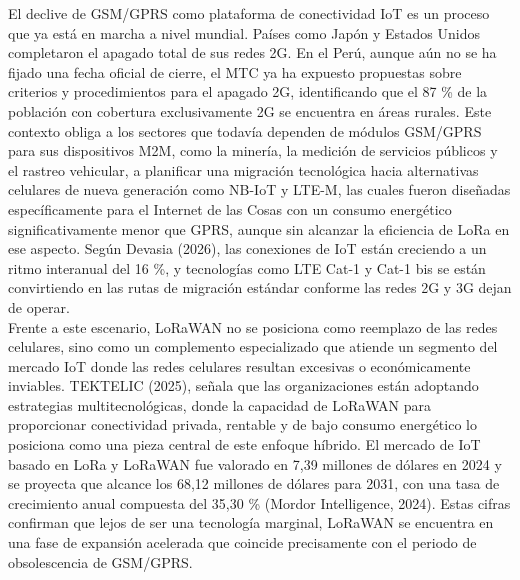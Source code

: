 \documentclass[12pt,a4paper]{article}
\begin{document}
	El declive de GSM/GPRS como plataforma de conectividad IoT es un proceso que ya está en marcha a nivel mundial. Países como Japón y Estados Unidos completaron el apagado total de sus redes 2G. En el Perú, aunque aún no se ha fijado una fecha oficial de cierre, el MTC ya ha expuesto propuestas sobre criterios y procedimientos para el apagado 2G, identificando que el 87 \% de la población con cobertura exclusivamente 2G se encuentra en áreas rurales. Este contexto obliga a los sectores que todavía dependen de módulos GSM/GPRS para sus dispositivos M2M, como la minería, la medición de servicios públicos y el rastreo vehicular, a planificar una migración tecnológica hacia alternativas celulares de nueva generación como NB-IoT y LTE-M, las cuales fueron diseñadas específicamente para el Internet de las Cosas con un consumo energético significativamente menor que GPRS, aunque sin alcanzar la eficiencia de LoRa en ese aspecto. Según Devasia (2026), las conexiones de IoT están creciendo a un ritmo interanual del 16 \%, y tecnologías como LTE Cat-1 y Cat-1 bis se están convirtiendo en las rutas de migración estándar conforme las redes 2G y 3G dejan de operar.\\

	Frente a este escenario, LoRaWAN no se posiciona como reemplazo de las redes celulares, sino como un complemento especializado que atiende un segmento del mercado IoT donde las redes celulares resultan excesivas o económicamente inviables. TEKTELIC (2025), señala que las organizaciones están adoptando estrategias multitecnológicas, donde la capacidad de LoRaWAN para proporcionar conectividad privada, rentable y de bajo consumo energético lo posiciona como una pieza central de este enfoque híbrido. El mercado de IoT basado en LoRa y LoRaWAN fue valorado en 7,39 millones de dólares en 2024 y se proyecta que alcance los 68,12 millones de dólares para 2031, con una tasa de crecimiento anual compuesta del 35,30 \% (Mordor Intelligence, 2024). Estas cifras confirman que lejos de ser una tecnología marginal, LoRaWAN se encuentra en una fase de expansión acelerada que coincide precisamente con el periodo de obsolescencia de GSM/GPRS.\\
\end{document}
